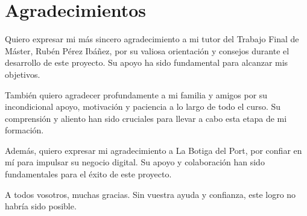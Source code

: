 \documentclass[12pt,a4paper]{report}
\begin{document}
\section*{Agradecimientos}\label{sec:agradecimientos}
Quiero expresar mi más sincero agradecimiento a mi tutor del Trabajo Final de Máster, Rubén Pérez Ibáñez, por su valiosa orientación y consejos durante el desarrollo de este proyecto. Su apoyo ha sido fundamental para alcanzar mis objetivos.

\vspace{0.5cm}

También quiero agradecer profundamente a mi familia y amigos por su incondicional apoyo, motivación y paciencia a lo largo de todo el curso. Su comprensión y aliento han sido cruciales para llevar a cabo esta etapa de mi formación.

\vspace{0.5cm}

Además, quiero expresar mi agradecimiento a La Botiga del Port, por confiar en mí para impulsar su negocio digital. Su apoyo y colaboración han sido fundamentales para el éxito de este proyecto.

\vspace{0.5cm}

A todos vosotros, muchas gracias. Sin vuestra ayuda y confianza, este logro no habría sido posible.

















\renewcommand{\bibname}{Bibliografía}

%

\end{document}
